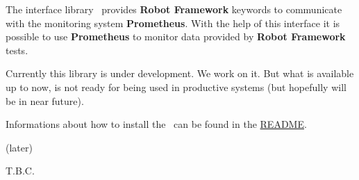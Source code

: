 %



%

The interface library \pkg\ provides \textbf{Robot Framework} keywords to communicate with the monitoring system \textbf{Prometheus}.
With the help of this interface it is possible to use \textbf{Prometheus} to monitor data provided by \textbf{Robot Framework} tests.

Currently this library is under development. We work on it. But what is available up to now, is not ready for being used in productive systems
(but hopefully will be in near future).

Informations about how to install the \pkg\ can be found in the
\href{https://github.com/test-fullautomation/robotframework-prometheus/blob/develop/README.rst}{README}.

(later)

T.B.C.
